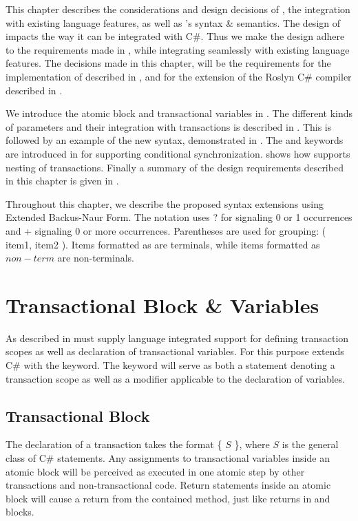 \makeatletter {}\makeatother
{}
This chapter describes the considerations and design decisions of \stmname, the integration with existing language features, as well as \stmname's syntax \& semantics. The design of \stmnamesp impacts the way it can be integrated with C\#. Thus we make the design adhere to the requirements made in , while integrating seamlessly with existing language features. The decisions made in this chapter, will be the requirements for the implementation of \stmnamesp described in , and for the extension of the Roslyn C\# compiler described in .

We introduce the atomic block and transactional variables in . The different kinds of parameters and their integration with transactions is described in . This is followed by an example of the new syntax, demonstrated in . The  and  keywords are introduced in  for supporting conditional synchronization.  shows how \stmnamesp supports nesting of transactions. Finally a summary of the design requirements described in this chapter is given in .

Throughout this chapter, we describe the proposed syntax extensions using  Extended Backus-Naur Form. The notation uses ? for signaling 0 or 1 occurrences and + signaling 0 or more occurrences. Parentheses are used for grouping: ( item1, item2 ). Items formatted as  are  terminals, while items formatted as $non-term$ are non-terminals.
\label{chap:stm_design}

\section{Transactional Block \& Variables}\label{sec:stm_design}
As described in  \stmnamesp must supply language integrated support for defining transaction scopes as well as declaration of transactional variables. For this purpose \stmnamesp extends C\# with the  keyword. The  keyword will serve as both a statement denoting a transaction scope as well as a modifier applicable to the declaration of variables. 

\subsection{Transactional Block}
\label{subsec:design_atomic_block}
The declaration of a transaction takes the format  \{ $S$ \}, where $S$ is the general class of C\# statements. Any assignments to transactional variables inside an atomic block will be perceived as executed in one atomic step by other transactions and non-transactional code. Return statements inside an atomic block will cause a return from the contained method, just like returns in  and  blocks. 
